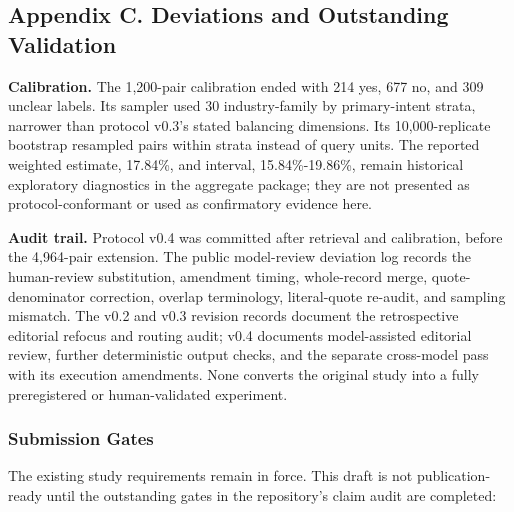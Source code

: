 \documentclass[10pt]{article}
\begin{document}
\hypertarget{appendix-c.-deviations-and-outstanding-validation}{%
\subsection{Appendix C. Deviations and Outstanding Validation}\label{appendix-c.-deviations-and-outstanding-validation}}

\textbf{Calibration.} The 1,200-pair calibration ended with 214 yes, 677 no, and 309 unclear labels. Its sampler used 30 industry-family by primary-intent strata, narrower than protocol v0.3's stated balancing dimensions. Its 10,000-replicate bootstrap resampled pairs within strata instead of query units. The reported weighted estimate, 17.84\%, and interval, 15.84\%-19.86\%, remain historical exploratory diagnostics in the aggregate package; they are not presented as protocol-conformant or used as confirmatory evidence here.

\textbf{Audit trail.} Protocol v0.4 was committed after retrieval and calibration, before the 4,964-pair extension. The public model-review deviation log records the human-review substitution, amendment timing, whole-record merge, quote-denominator correction, overlap terminology, literal-quote re-audit, and sampling mismatch. The v0.2 and v0.3 revision records document the retrospective editorial refocus and routing audit; v0.4 documents model-assisted editorial review, further deterministic output checks, and the separate cross-model pass with its execution amendments. None converts the original study into a fully preregistered or human-validated experiment.

\hypertarget{submission-gates}{%
\subsubsection{Submission Gates}\label{submission-gates}}

The existing study requirements remain in force. This draft is not publication-ready until the outstanding gates in the repository's claim audit are completed:
\end{document}

